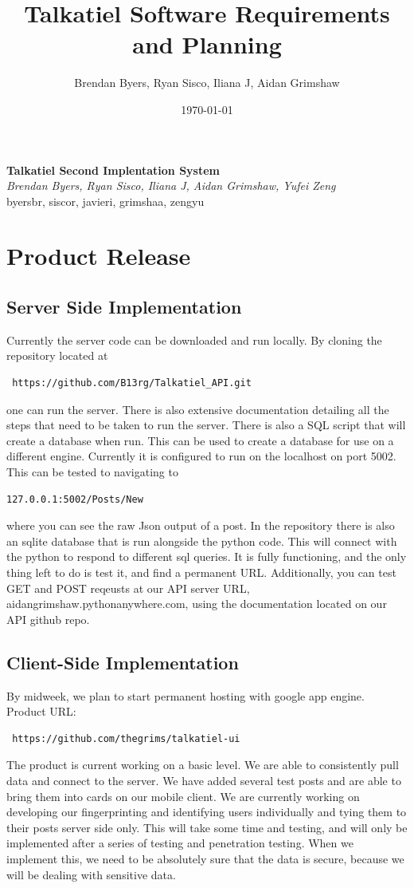 \documentclass[12pt]{article}
\title{Talkatiel Software Requirements and Planning}
\author{Brendan Byers, Ryan Sisco, Iliana J, Aidan Grimshaw}
\date{\today}
\begin{document}
\begin{center}
 \Large\textbf{Talkatiel Second Implentation System}\\
 \large\textit{Brendan Byers, Ryan Sisco, Iliana J, Aidan Grimshaw, Yufei Zeng}\\
 \large{byersbr, siscor, javieri, grimshaa, zengyu}\\
\end{center}

\tableofcontents
\section{Product Release} \subsection{Server Side Implementation} Currently the
server code can be downloaded and run locally.  By cloning the repository
located at\begin{verbatim} https://github.com/B13rg/Talkatiel_API.git
\end{verbatim}one can run the server.  There is also extensive documentation
detailing all the steps that need to be taken to run the server.  There is also
a SQL script that will create a database when run.  This can be used to create a
database for use on a different engine.  Currently it is configured to run on
the localhost on port 5002.  This can be tested to navigating to
\begin{verbatim}127.0.0.1:5002/Posts/New \end{verbatim}where you can see the raw
Json output of a post.  In the repository there is also an sqlite database that
is run alongside the python code.  This will connect with the python to respond
to different sql queries.  It is fully functioning, and the only thing left to
do is test it, and find a permanent URL. Additionally, you can test GET and POST
reqeusts at our API server URL, aidangrimshaw.pythonanywhere.com, using the
documentation located on our API github repo.

\subsection{Client-Side Implementation}
By midweek, we plan to start permanent hosting with google app engine. Product
URL:\begin{verbatim} https://github.com/thegrims/talkatiel-ui \end{verbatim} The
product is current working on a basic level. We are able to consistently pull
data and connect to the server. We have added several test posts and are able to
bring them into cards on our mobile client. We are currently working on
developing our fingerprinting and identifying users individually and tying them
to their posts server side only. This will take some time and testing, and will
only be implemented after a series of testing and penetration testing. When we
implement this, we need to be absolutely sure that the data is secure, because
we will be dealing with sensitive data.
\end{document}
